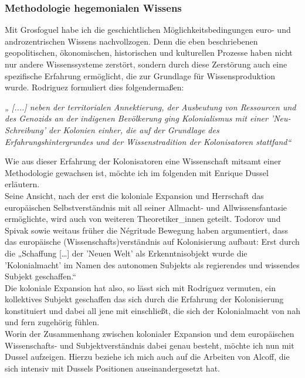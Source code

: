 \subsubsection{Methodologie hegemonialen Wissens}
Mit Grosfoguel habe ich die geschichtlichen Möglichkeitsbedingungen euro- und androzentrischen Wissens nachvollzogen. Denn die eben beschriebenen geopolitischen, ökonomischen, historischen und kulturellen Prozesse haben nicht nur andere Wissenssysteme zerstört, sondern durch diese Zerstörung auch eine spezifische Erfahrung ermöglicht, die zur Grundlage für Wissensproduktion wurde. Rodriguez formuliert dies folgendermaßen:
\begin{myenv}
  \textit{
  „
[....] neben der territorialen Annektierung, der Ausbeutung von Ressourcen und des Genozids an der indigenen Bevölkerung ging Kolonialismus mit einer 'Neu-Schreibung' der Kolonien einher, die auf der Grundlage des Erfahrungshintergrundes und der Wissenstradition der Kolonisatoren stattfand“ }\footnotemark{}
\end{myenv}
Wie aus dieser Erfahrung der Kolonisatoren eine Wissenschaft mitsamt einer
Methodologie gewachsen ist, möchte ich im folgenden mit Enrique Dussel
erläutern. \\
Seine Ansicht, nach der erst die koloniale Expansion und Herrschaft
das europäischen Selbstverständnis mit all seiner Allmacht- und
Allwissensfantasie ermöglichte, wird auch von weiteren Theoretiker\_innen
geteilt. Todorov und Spivak sowie weitaus früher die Négritude Bewegung haben
argumentiert, dass das europäische (Wissenschafts)verständnis auf Kolonisierung
aufbaut: Erst durch die „Schaffung […] der 'Neuen Welt' als
Erkenntnisobjekt wurde die 'Kolonialmacht' im Namen des autonomen Subjekts als
regierendes und wissendes Subjekt geschaffen.“\\
Die koloniale Expansion
hat also, so lässt sich mit Rodriguez vermuten, ein kollektives Subjekt
geschaffen das sich durch die Erfahrung der Kolonisierung konstituiert und
dabei all jene mit einschließt, die sich der Kolonialmacht von nah und fern
zugehörig fühlen.  \\
Worin der Zusammenhang zwischen kolonialer Expansion und dem
europäischen Wissenschafts- und Subjektverständnis dabei genau besteht, möchte
ich nun mit Dussel aufzeigen. Hierzu beziehe ich mich auch auf die Arbeiten von
Alcoff, die sich intensiv mit Dussels Positionen auseinandergesetzt hat.\\

